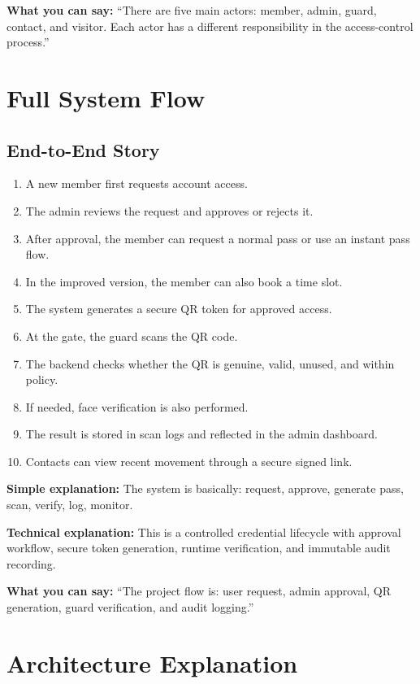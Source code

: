 \documentclass[12pt,letterpaper]{article}
\newcommand{\simple}[1]{\textbf{Simple explanation:} #1}
\newcommand{\technical}[1]{\textbf{Technical explanation:} #1}
\newcommand{\say}[1]{\textbf{What you can say:} ``#1''}
\begin{document}
\say{There are five main actors: member, admin, guard, contact, and visitor. Each actor has a different responsibility in the access-control process.}

\section{Full System Flow}

\subsection{End-to-End Story}

\begin{enumerate}
    \item A new member first requests account access.
    \item The admin reviews the request and approves or rejects it.
    \item After approval, the member can request a normal pass or use an instant pass flow.
    \item In the improved version, the member can also book a time slot.
    \item The system generates a secure QR token for approved access.
    \item At the gate, the guard scans the QR code.
    \item The backend checks whether the QR is genuine, valid, unused, and within policy.
    \item If needed, face verification is also performed.
    \item The result is stored in scan logs and reflected in the admin dashboard.
    \item Contacts can view recent movement through a secure signed link.
\end{enumerate}

\simple{The system is basically: request, approve, generate pass, scan, verify, log, monitor.}

\technical{This is a controlled credential lifecycle with approval workflow, secure token generation, runtime verification, and immutable audit recording.}

\say{The project flow is: user request, admin approval, QR generation, guard verification, and audit logging.}

\section{Architecture Explanation}
\end{document}
